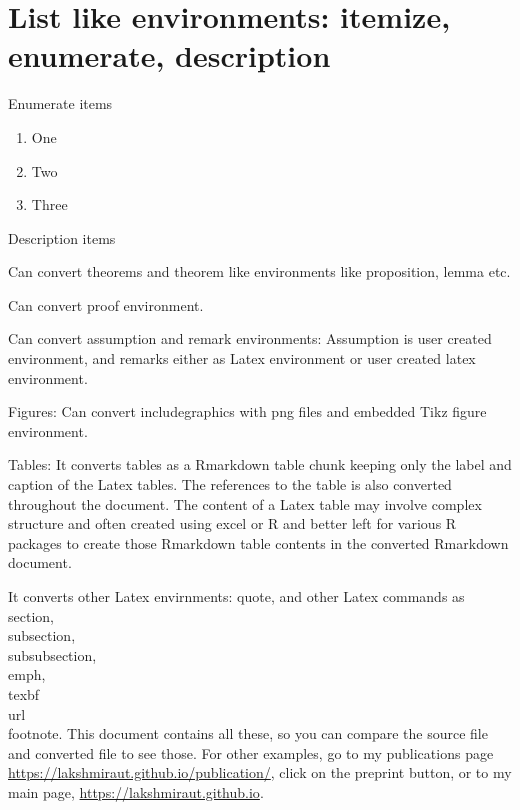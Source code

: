 \documentclass[12pt,svgnames]{article}
\begin{document}

\section{List like environments: itemize, enumerate, description}\label{sec6}

Enumerate items

\begin{enumerate}
\item One
\item Two
\item Three
\end{enumerate}

Description items

\begin{description} 
  \item Can convert theorems and theorem like environments like proposition, lemma etc.

  \item Can convert proof environment. 
  
  \item Can convert assumption and remark environments: Assumption is user created environment, and remarks either as Latex environment or user created latex environment.
   
  \item Figures: Can convert includegraphics with png files and embedded Tikz figure environment. 
  
  \item Tables: It converts tables as a Rmarkdown table chunk keeping only the label and caption of the Latex tables. The references to the table is also converted throughout the document.  The content of a Latex table may involve complex structure and often created using excel or R and better left for various R packages to create those Rmarkdown table contents in the converted Rmarkdown document.
  
  \item It converts other Latex envirnments: quote,  and other Latex commands as  \\section, \\subsection, \\subsubsection,  \\emph, \\texbf \\url \\footnote.  This document contains all these, so you can compare the source file and converted file to see those.  For other examples, go to my publications page \url{https://lakshmiraut.github.io/publication/}, click on the preprint button, or to my main page, \url{https://lakshmiraut.github.io}.
  
\end{description} 
\end{document}
